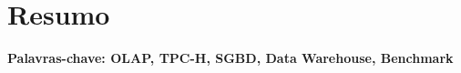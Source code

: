 
\chapter*{Resumo}

\noindent


\vspace{1cm}
\noindent
\textbf{Palavras-chave: OLAP, TPC-H, SGBD, Data Warehouse, Benchmark}


